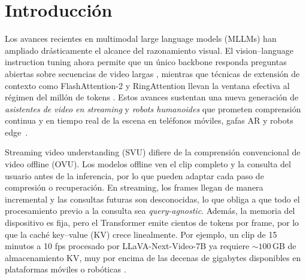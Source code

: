 \section{Introducción}
\label{sec:intro}

Los avances recientes en multimodal large language models (MLLMs) han ampliado drásticamente el alcance del razonamiento visual. El vision--language instruction tuning ahora permite que un único backbone responda preguntas abiertas sobre secuencias de video largas \cite{llava,openai2023gpt4v,qwen2.5}, mientras que técnicas de extensión de contexto como FlashAttention-2 y RingAttention llevan la ventana efectiva al régimen del millón de tokens \cite{dao2023flashattention2,ringattention,peng2024yarn}. Estos avances sustentan una nueva generación de {\em asistentes de video en streaming} y \emph{robots humanoides} que prometen comprensión continua y en tiempo real de la escena en teléfonos móviles, gafas AR y robots edge~\cite{deepmind2023astra,openai2023gpt4o,waisberg2024meta,MorganStanley2024FigureAI}.

Streaming video understanding (SVU) difiere de la comprensión convencional de video offline (OVU). Los modelos offline ven el clip completo y la consulta del usuario antes de la inferencia, por lo que pueden adaptar cada paso de compresión o recuperación. En streaming, los frames llegan de manera incremental y las consultas futuras son desconocidas, lo que obliga a que todo el procesamiento previo a la consulta sea {\em query-agnostic}. Además, la memoria del dispositivo es fija, pero el Transformer emite cientos de tokens por frame, por lo que la caché key--value (KV) crece linealmente. Por ejemplo, un clip de 15 minutos a 10 fps procesado por LLaVA-Next-Video-7B ya requiere \(\sim\!100\)\,GB de almacenamiento KV, muy por encima de las decenas de gigabytes disponibles en plataformas móviles o robóticas \cite{zhang2024llavanext-video,Karumbunathan2022JetsonAGXOrin}.

